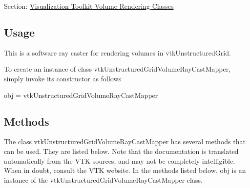 Section\-: \hyperlink{sec_vtkvolumerendering}{Visualization Toolkit Volume Rendering Classes} \hypertarget{vtkwidgets_vtkxyplotwidget_Usage}{}\subsection{Usage}\label{vtkwidgets_vtkxyplotwidget_Usage}
This is a software ray caster for rendering volumes in vtk\-Unstructured\-Grid.

To create an instance of class vtk\-Unstructured\-Grid\-Volume\-Ray\-Cast\-Mapper, simply invoke its constructor as follows \begin{DoxyVerb}  obj = vtkUnstructuredGridVolumeRayCastMapper
\end{DoxyVerb}
 \hypertarget{vtkwidgets_vtkxyplotwidget_Methods}{}\subsection{Methods}\label{vtkwidgets_vtkxyplotwidget_Methods}
The class vtk\-Unstructured\-Grid\-Volume\-Ray\-Cast\-Mapper has several methods that can be used. They are listed below. Note that the documentation is translated automatically from the V\-T\-K sources, and may not be completely intelligible. When in doubt, consult the V\-T\-K website. In the methods listed below, {\ttfamily obj} is an instance of the vtk\-Unstructured\-Grid\-Volume\-Ray\-Cast\-Mapper class. 
